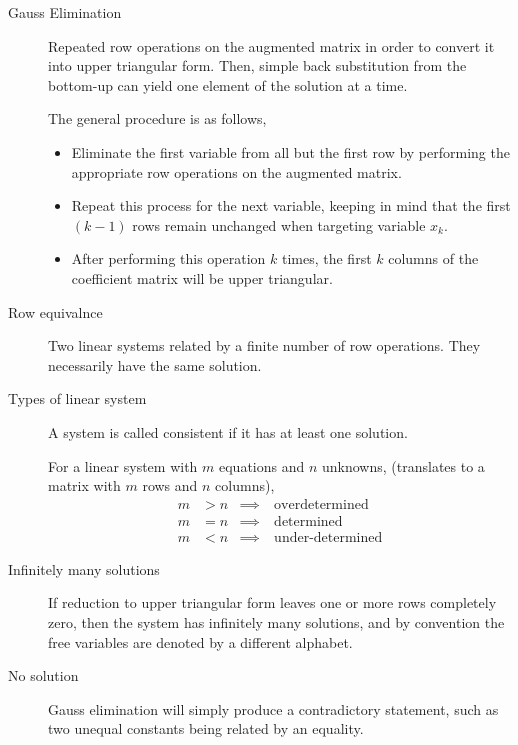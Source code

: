 \begin{description}
    \item[Gauss Elimination] Repeated row operations on the augmented matrix in order
        to convert it into upper triangular form. Then, simple back substitution from the
        bottom-up can yield one element of the solution at a time.
        \par The general procedure is as follows,
        \begin{itemize}
            \item Eliminate the first variable from all but the first row by performing
                  the appropriate row operations on the augmented matrix.
            \item Repeat this process for the next variable, keeping in mind that the
                  first $ (k-1) $ rows remain unchanged when targeting variable $ x_k $.
            \item After performing this operation $ k $ times, the first $ k $ columns
                  of the coefficient matrix will be upper triangular.
        \end{itemize}

    \item[Row equivalnce] Two linear systems related by a finite number of row
        operations. They necessarily have the same solution.

    \item[Types of linear system] A system is called consistent if it has at least one
        solution. \par
        For a linear system with $ m $ equations and $ n $ unknowns, (translates to a
        matrix with $ m $ rows and $ n $ columns),
        \begin{align}
            m & > n & \implies & \ \text{overdetermined}   \\
            m & = n & \implies & \ \text{determined}       \\
            m & < n & \implies & \ \text{under-determined}
        \end{align}

    \item[Infinitely many solutions] If reduction to upper triangular form leaves
        one or more rows completely zero, then the system has infinitely many solutions,
        and by convention the free variables are denoted by a different alphabet.

    \item[No solution] Gauss elimination will simply produce a contradictory statement,
        such as two unequal constants being related by an equality.


\end{description}
